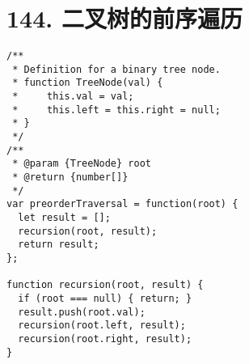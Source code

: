 \newpage
\section{144. 二叉树的前序遍历}
\label{leetcode:144}

\begin{verbatim}
/**
 * Definition for a binary tree node.
 * function TreeNode(val) {
 *     this.val = val;
 *     this.left = this.right = null;
 * }
 */
/**
 * @param {TreeNode} root
 * @return {number[]}
 */
var preorderTraversal = function(root) {
  let result = [];
  recursion(root, result);
  return result;
};

function recursion(root, result) {
  if (root === null) { return; }
  result.push(root.val);
  recursion(root.left, result);
  recursion(root.right, result);
}
\end{verbatim}